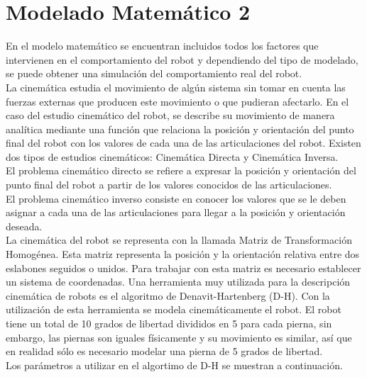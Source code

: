 \section{Modelado Matemático 2}
En el modelo matemático se encuentran incluidos todos los factores que intervienen en el comportamiento del robot y dependiendo del tipo de modelado, se puede obtener una simulación del comportamiento real del robot.\\

La cinemática estudia el movimiento de algún sistema sin tomar en cuenta las fuerzas externas que producen este movimiento o que pudieran afectarlo. En el caso del estudio cinemático del robot, se describe su movimiento de manera analítica mediante una función que relaciona la posición y orientación del punto final del robot con los valores de cada una de las articulaciones del robot. Existen dos tipos de estudios cinemáticos: Cinemática Directa y Cinemática Inversa.\\

El problema cinemático directo se refiere a expresar la posición y orientación del punto final del robot a partir de los valores conocidos de las articulaciones.\\

El problema cinemático inverso consiste en conocer los valores que se le deben asignar a cada una de las articulaciones para llegar a la posición y orientación deseada.\\

La cinemática del robot se representa con la llamada Matriz de Transformación Homogénea. Esta matriz representa la posición y la orientación relativa entre dos eslabones seguidos o unidos. Para trabajar con esta matriz es necesario establecer un sistema de coordenadas. Una herramienta muy utilizada para la descripción cinemática de robots es el algoritmo de Denavit-Hartenberg (D-H). Con la utilización de esta herramienta se modela cinemáticamente el robot. El robot tiene un total de 10 grados de libertad divididos en 5 para cada pierna, sin embargo, las piernas son iguales físicamente y su movimiento es similar, así que en realidad sólo es necesario modelar una pierna de 5 grados de libertad. \\

Los parámetros a utilizar en el algortimo de D-H se muestran a continuación.\\

\newpage

